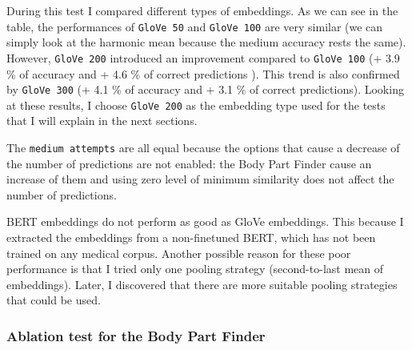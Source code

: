
During this test I compared different types of embeddings. As we can see in the table, the performances of \texttt{GloVe 50} and \texttt{GloVe 100} are very similar (we can simply look at the harmonic mean because the medium accuracy rests the same). However, \texttt{GloVe 200} introduced an improvement compared to \texttt{GloVe 100} (+ 3.9 \% of accuracy and + 4.6 \% of correct predictions ). This trend is also confirmed by \texttt{GloVe 300} (+ 4.1 \% of accuracy and + 3.1 \% of correct predictions). Looking at these results, I choose \texttt{GloVe 200} as the embedding type used for the tests that I will explain in the next sections.

The \texttt{medium attempts} are all equal because the options that cause a decrease of the number of predictions are not enabled: the Body Part Finder cause an increase of them and using zero level of minimum similarity does not affect the number of predictions.

BERT embeddings do not perform as good as GloVe embeddings. This because I extracted the embeddings from a non-finetuned BERT, which has not been trained on any medical corpus. Another possible reason for these poor performance is that I tried only one pooling strategy (second-to-last mean of embeddings). Later, I discovered that there are more suitable pooling strategies that could be used. %

\newpage
\subsubsection{Ablation test for the Body Part Finder}

